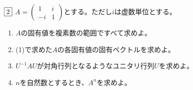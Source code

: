 \begin{tcolorbox} %
	$\fbox{2}$ $A= \begin{pmatrix}1& i\\ {-i}& 1\end{pmatrix}$とする。ただし$i$は虚数単位とする。
\begin{enumerate}
	\item $A$の固有値を複素数の範囲ですべて求めよ。
	\item (1)で求めた$A$の各固有値の固有ベクトルを求めよ。
	\item $U^{-1}AU$が対角行列となるようなユニタリ行列$U$を求めよ。
	\item $n$を自然数とするとき、$A^n$を求めよ。
\end{enumerate}
\end{tcolorbox}

